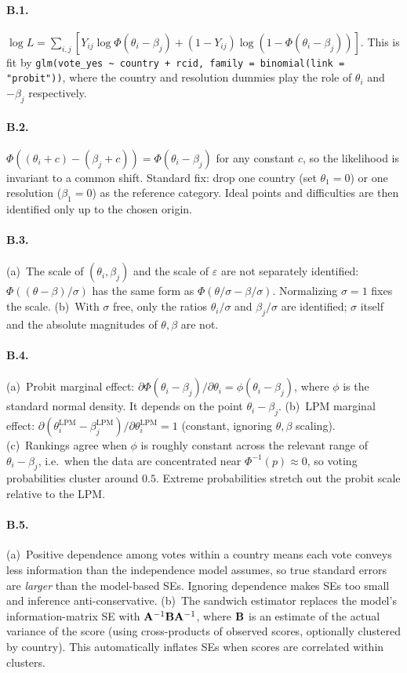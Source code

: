 \documentclass{article}
\begin{document}
\paragraph{B.1.}  $\log L = \sum_{i,j}\left[Y_{ij}\log\Phi(\theta_i - \beta_j) + (1 - Y_{ij})\log(1 - \Phi(\theta_i - \beta_j))\right]$.  This is fit by \texttt{glm(vote\_yes \~{} country + rcid, family = binomial(link = "probit"))}, where the country and resolution dummies play the role of $\theta_i$ and $-\beta_j$ respectively.

\paragraph{B.2.}  $\Phi((\theta_i + c) - (\beta_j + c)) = \Phi(\theta_i - \beta_j)$ for any constant $c$, so the likelihood is invariant to a common shift.  Standard fix: drop one country (set $\theta_1 = 0$) or one resolution ($\beta_1 = 0$) as the reference category.  Ideal points and difficulties are then identified only up to the chosen origin.

\paragraph{B.3.}  (a)~The scale of $(\theta_i, \beta_j)$ and the scale of $\varepsilon$ are not separately identified: $\Phi((\theta - \beta)/\sigma)$ has the same form as $\Phi(\theta/\sigma - \beta/\sigma)$.  Normalizing $\sigma = 1$ fixes the scale.  (b)~With $\sigma$ free, only the ratios $\theta_i/\sigma$ and $\beta_j/\sigma$ are identified; $\sigma$ itself and the absolute magnitudes of $\theta, \beta$ are not.

\paragraph{B.4.}  (a)~Probit marginal effect: $\partial \Phi(\theta_i - \beta_j)/\partial\theta_i = \phi(\theta_i - \beta_j)$, where $\phi$ is the standard normal density.  It depends on the point $\theta_i - \beta_j$.  (b)~LPM marginal effect: $\partial(\theta_i^{\text{LPM}} - \beta_j^{\text{LPM}})/\partial\theta_i^{\text{LPM}} = 1$ (constant, ignoring $\theta, \beta$ scaling).  (c)~Rankings agree when $\phi$ is roughly constant across the relevant range of $\theta_i - \beta_j$, i.e.\ when the data are concentrated near $\Phi^{-1}(p) \approx 0$, so voting probabilities cluster around $0.5$.  Extreme probabilities stretch out the probit scale relative to the LPM.

\paragraph{B.5.}  (a)~Positive dependence among votes within a country means each vote conveys less information than the independence model assumes, so true standard errors are \emph{larger} than the model-based SEs.  Ignoring dependence makes SEs too small and inference anti-conservative.  (b)~The sandwich estimator replaces the model's information-matrix SE with ${\mathbf A}^{-1}{\mathbf B}{\mathbf A}^{-1}$, where ${\mathbf B}$ is an estimate of the actual variance of the score (using cross-products of observed scores, optionally clustered by country).  This automatically inflates SEs when scores are correlated within clusters.
\end{document}
